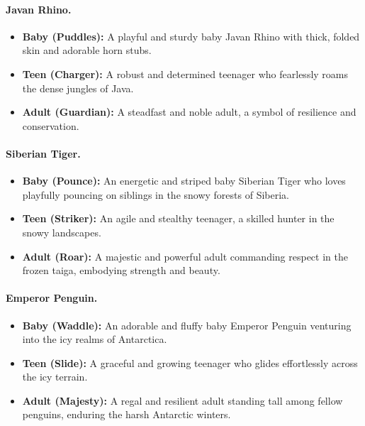 \paragraph{Javan Rhino.}
\begin{itemize}[nosep]
\item \textbf{Baby (Puddles):} A playful and sturdy baby Javan Rhino with thick, folded skin and adorable horn stubs.
\item \textbf{Teen (Charger):} A robust and determined teenager who fearlessly roams the dense jungles of Java.
\item \textbf{Adult (Guardian):} A steadfast and noble adult, a symbol of resilience and conservation.
\end{itemize}

\paragraph{Siberian Tiger.}
\begin{itemize}[nosep]
\item \textbf{Baby (Pounce):} An energetic and striped baby Siberian Tiger who loves playfully pouncing on siblings in the snowy forests of Siberia.
\item \textbf{Teen (Striker):} An agile and stealthy teenager, a skilled hunter in the snowy landscapes.
\item \textbf{Adult (Roar):} A majestic and powerful adult commanding respect in the frozen taiga, embodying strength and beauty.
\end{itemize}

\paragraph{Emperor Penguin.}
\begin{itemize}[nosep]
\item \textbf{Baby (Waddle):} An adorable and fluffy baby Emperor Penguin venturing into the icy realms of Antarctica.
\item \textbf{Teen (Slide):} A graceful and growing teenager who glides effortlessly across the icy terrain.
\item \textbf{Adult (Majesty):} A regal and resilient adult standing tall among fellow penguins, enduring the harsh Antarctic winters.
\end{itemize}

